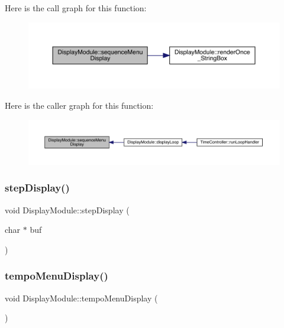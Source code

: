 Here is the call graph for this function\+:
\nopagebreak
\begin{figure}[H]
\begin{center}
\leavevmode
\includegraphics[width=350pt]{class_display_module_a3e2fc0a60ef41f41e57d463faf59bd2b_cgraph}
\end{center}
\end{figure}
Here is the caller graph for this function\+:
\nopagebreak
\begin{figure}[H]
\begin{center}
\leavevmode
\includegraphics[width=350pt]{class_display_module_a3e2fc0a60ef41f41e57d463faf59bd2b_icgraph}
\end{center}
\end{figure}
\mbox{\label{class_display_module_ac1d55595826fc36738b2d9df6be9516e}} 
\subsubsection{\texorpdfstring{step\+Display()}{stepDisplay()}}
{\footnotesize\ttfamily void Display\+Module\+::step\+Display (\begin{DoxyParamCaption}\item[{char $\ast$}]{buf }\end{DoxyParamCaption})}

\mbox{\label{class_display_module_ac5999c2f0f4b1ecc12bafe7094c7b7d2}} 
\subsubsection{\texorpdfstring{tempo\+Menu\+Display()}{tempoMenuDisplay()}}
{\footnotesize\ttfamily void Display\+Module\+::tempo\+Menu\+Display (\begin{DoxyParamCaption}{ }\end{DoxyParamCaption})}

